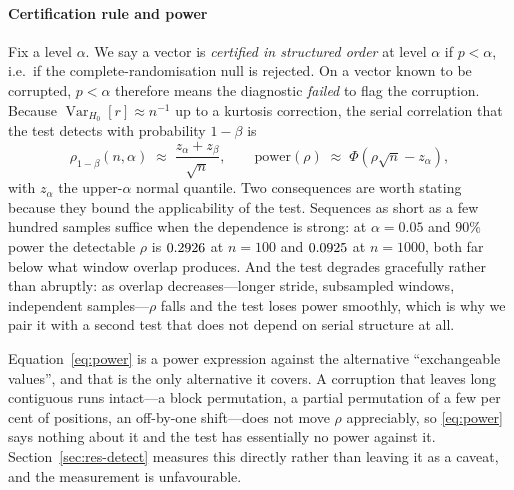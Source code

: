 \documentclass[a4paper,fleqn]{cas-sc}
\begin{document}
\paragraph{Certification rule and power}
Fix a level $\alpha$. We say a vector is \emph{certified in structured order} at
level $\alpha$ if $p < \alpha$, i.e.\ if the complete-randomisation null is
rejected. On a vector known to be corrupted, $p < \alpha$ therefore means the
diagnostic \emph{failed} to flag the corruption. Because
$\operatorname{Var}_{H_0}[r] \approx n^{-1}$ up
to a kurtosis correction, the serial correlation that the test detects with
probability $1-\beta$ is
\begin{equation}
\rho_{1-\beta}(n,\alpha) \;\approx\; \frac{z_{\alpha}+z_{\beta}}{\sqrt{n}},
\qquad
\text{power}(\rho) \;\approx\; \Phi\!\left(\rho\sqrt{n} - z_{\alpha}\right),
\label{eq:power}
\end{equation}
with $z_\alpha$ the upper-$\alpha$ normal quantile. Two consequences are worth
stating because they bound the applicability of the test. Sequences as short as a
few hundred samples suffice when the dependence is strong: at $\alpha = 0.05$ and
$90\%$ power the detectable $\rho$ is $0.2926{}$ at $n = 100$ and
$0.0925{}$ at $n = 1000$, both far below what window overlap
produces. And the test degrades gracefully rather than abruptly: as overlap
decreases---longer stride, subsampled windows, independent samples---$\rho$ falls
and the test loses power smoothly, which is why we pair it with a second test that
does not depend on serial structure at all.

Equation~\eqref{eq:power} is a power expression against the alternative
``exchangeable values'', and that is the only alternative it covers. A corruption
that leaves long contiguous runs intact---a block permutation, a partial
permutation of a few per cent of positions, an off-by-one shift---does not move
$\rho$ appreciably, so \eqref{eq:power} says nothing about it and the test has
essentially no power against it. Section~\ref{sec:res-detect} measures this
directly rather than leaving it as a caveat, and the measurement is unfavourable.
\end{document}
